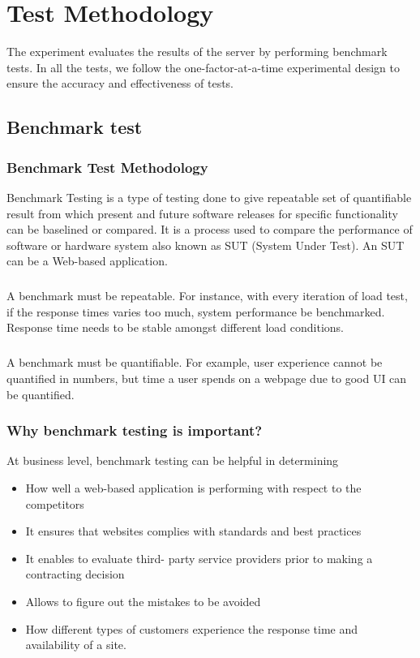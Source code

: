 \documentclass[../thesis.tex]{subfiles}
\begin{document}
\chapter{Test Methodology}
	The experiment evaluates the results of the server by performing benchmark tests. In all the tests, we follow the one-factor-at-a-time experimental design \cite{oaat} to ensure the accuracy and effectiveness of tests.
	
\section{Benchmark test}
\subsection{Benchmark Test Methodology}
Benchmark Testing is a type of testing done to give repeatable set of quantifiable result from which present and future software releases for specific functionality can be baselined or compared. It is a process used to compare the performance of software or hardware system also known as SUT (System Under Test). An SUT can be a Web-based application.
\paragraph{}
A benchmark must be repeatable. For instance, with every iteration of load test, if the response times varies too much, system performance be benchmarked. Response time needs to be stable amongst different load conditions.
\paragraph{}
A benchmark must be quantifiable. For example, user experience cannot be quantified in numbers, but time a user spends on a webpage due to good UI can be quantified.

\subsection{Why benchmark testing is important?}
At business level, benchmark testing can be helpful in determining
\vspace{5mm}
\begin{itemize}
	\item How well a web-based application is performing with respect to the competitors
	\item It ensures that websites complies with standards and best practices
	\item It enables to evaluate third- party service providers prior to making a contracting decision
	\item Allows to figure out the mistakes to be avoided
	\item How different types of customers experience the response time and availability of a site.
\end{itemize}
\end{document}
